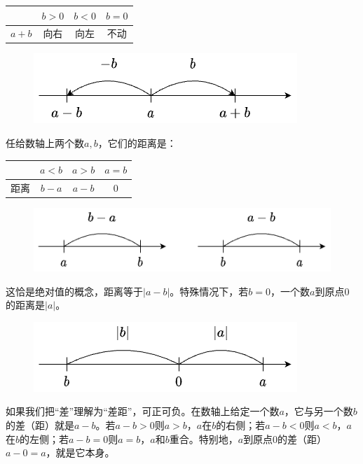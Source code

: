 \documentclass[b5paper]{ctexart}
\begin{document}
\begin{center}
\begin{tabular}{c|c|c|c}
        & $b > 0$ & $b < 0$ & $b = 0$ \\
\hline
$a + b$ & 向右     & 向左    & 不动
\end{tabular}
\end{center}

\begin{figure}[htbp]
 \centering
 \includegraphics[scale=0.45]{img/translate}
\end{figure}

任给数轴上两个数$a, b$，它们的距离是：

\begin{center}
  \begin{tabular}{c|c|c|c}
      & $a < b$ & $a > b$ & $a = b$ \\
  \hline
  距离 & $b - a$ & $a - b$ & $0$
  \end{tabular}
\end{center}

\begin{figure}[htbp]
 \centering
 \includegraphics[scale=0.4]{img/distance}
\end{figure}

这恰是绝对值的概念，距离等于$|a - b|$。特殊情况下，若$b = 0$，一个数$a$到原点0的距离是$|a|$。

\begin{figure}[htbp]
 \centering
 \includegraphics[scale=0.4]{img/abs}
\end{figure}

如果我们把“差”理解为“差距”，可正可负。在数轴上给定一个数$a$，它与另一个数$b$的差（距）就是$a - b$。若$a - b > 0$则$a > b$，$a$在$b$的右侧；若$a - b < 0$则$a < b$，$a$在$b$的左侧；若$a - b = 0$则$a = b$，$a$和$b$重合。特别地，$a$到原点0的差（距）$a - 0 = a$，就是它本身。
\end{document}

